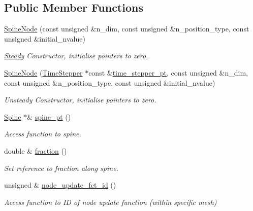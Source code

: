 \subsection*{Public Member Functions}
\begin{DoxyCompactItemize}
\item 
\hyperlink{classoomph_1_1SpineNode_af2bbfcecaae18b9256de02a0f0a9bddd}{Spine\+Node} (const unsigned \&n\+\_\+dim, const unsigned \&n\+\_\+position\+\_\+type, const unsigned \&initial\+\_\+nvalue)
\begin{DoxyCompactList}\small\item\em \hyperlink{classoomph_1_1Steady}{Steady} Constructor, initialise pointers to zero. \end{DoxyCompactList}\item 
\hyperlink{classoomph_1_1SpineNode_a35d835d5f7b549f45b69669044e30545}{Spine\+Node} (\hyperlink{classoomph_1_1TimeStepper}{Time\+Stepper} $\ast$const \&\hyperlink{classoomph_1_1Data_a5b34970d16205921dca3ada720da8445}{time\+\_\+stepper\+\_\+pt}, const unsigned \&n\+\_\+dim, const unsigned \&n\+\_\+position\+\_\+type, const unsigned \&initial\+\_\+nvalue)
\begin{DoxyCompactList}\small\item\em Unsteady Constructor, initialise pointers to zero. \end{DoxyCompactList}\item 
\hyperlink{classoomph_1_1Spine}{Spine} $\ast$\& \hyperlink{classoomph_1_1SpineNode_a047fd6368eb9140f51128723a9e07dba}{spine\+\_\+pt} ()
\begin{DoxyCompactList}\small\item\em Access function to spine. \end{DoxyCompactList}\item 
double \& \hyperlink{classoomph_1_1SpineNode_aea50ab25f54e35d2121b090ae7b0c313}{fraction} ()
\begin{DoxyCompactList}\small\item\em Set reference to fraction along spine. \end{DoxyCompactList}\item 
unsigned \& \hyperlink{classoomph_1_1SpineNode_ad805d587c63a24940b7de0fa99fd8101}{node\+\_\+update\+\_\+fct\+\_\+id} ()
\begin{DoxyCompactList}\small\item\em Access function to ID of node update function (within specific mesh) \end{DoxyCompactList}\item 

\end{DoxyCompactItemize}
